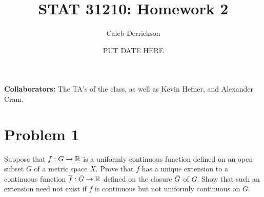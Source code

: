 

\title{STAT 31210: Homework 2}
\author{Caleb Derrickson}
\date{PUT DATE HERE}


\onehalfspacing
\maketitle
\allowdisplaybreaks
{\color{cit}\vspace{2mm}\noindent\textbf{Collaborators:}} The TA's of the class, as well as Kevin Hefner, and Alexander Cram.

\tableofcontents

\newpage
\section{Problem 1}
Suppose that $f: G\rightarrow \mathbb{R}$ is a uniformly continuous function defined on an open subset $G$ of a metric space $X$. Prove that $f$ has a unique extension to a continuous function $\overline{f} : \Bar{G} \rightarrow \mathbb{R}$ defined on the closure $\Bar{G}$ of $G$. Show that such an extension need not exist if $f$ is continuous but not uniformly continuous on $G$.

\newcommand{\fbar}{\Bar{f}}

